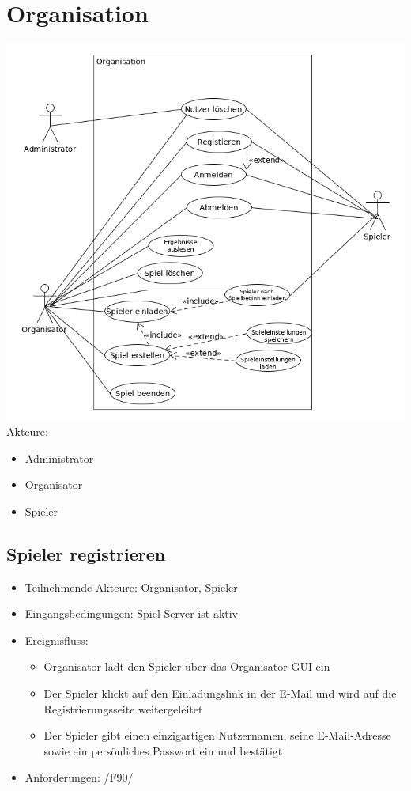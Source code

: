 \documentclass[a4paper]{scrreprt}
\begin{document}
    \section{Organisation}
    \includegraphics[width=\textwidth]{uml/export/Organisation.png}
    Akteure:
    \begin{itemize}
        \item \Gls{Administrator}
        \item \Gls{Organisator}
        \item \Gls{Spieler}
    \end{itemize}
    \newpage
   \subsection{Spieler registrieren}
    \begin{itemize}
        \item Teilnehmende Akteure: \Gls{Organisator}, \Gls{Spieler}
        \item Eingangsbedingungen: \Gls{Spiel-Server} ist aktiv
        \item Ereignisfluss:
        \begin{itemize}
            \item \Gls{Organisator} lädt den \Gls{Spieler} über das Organisator-GUI ein
            \item Der \Gls{Spieler} klickt auf den Einladungslink in der E-Mail und wird auf die Registrierungsseite weitergeleitet
            \item Der \Gls{Spieler} gibt einen einzigartigen Nutzernamen, seine E-Mail-Adresse sowie ein persönliches Passwort ein und bestätigt
        \end{itemize}
        \item Anforderungen: /F90/
    \end{itemize}
\end{document}
